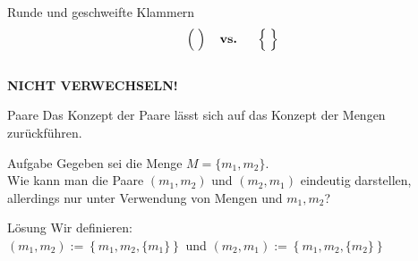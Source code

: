 \begin{frame}
	\centering
	\Huge
	\alert{Runde und geschweifte Klammern 
		   $$\Big(\;\Big) \textbf{\quad vs. \quad} \Big\{\;\Big\}$$ \\
		   \textbf{NICHT VERWECHSELN!}}
\end{frame}

\begin{frame}{Paare}
	Das Konzept der Paare lässt sich auf das Konzept der Mengen zurückführen.
	
	\begin{block}{Aufgabe}
		Gegeben sei die Menge $M = \{m_1, m_2\}$.\\
		Wie kann man die Paare $(m_1, m_2)$ und $(m_2, m_1)$ eindeutig darstellen, allerdings nur unter Verwendung von Mengen und $m_1, m_2$?
	\end{block}
	\pause
	
	\begin{block}{Lösung}
		Wir definieren: \\ 
		$(m_1, m_2) := \left\lbrace m_1, m_2, \{m_1\}\right\rbrace$ und $(m_2, m_1) := \left\lbrace m_1, m_2, \{m_2\}\right\rbrace$
	\end{block}
\end{frame}